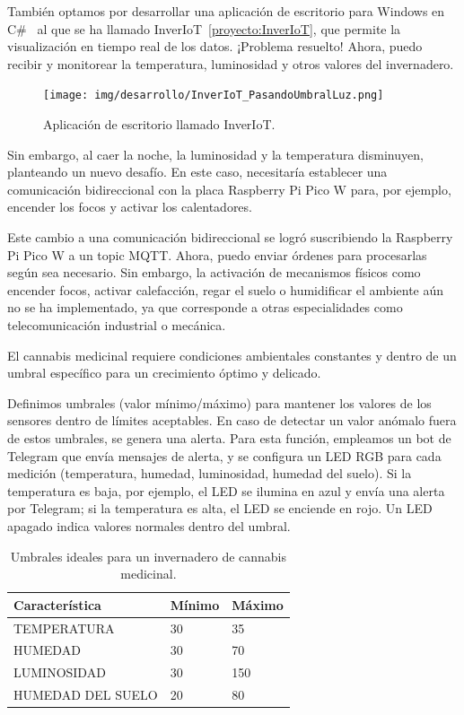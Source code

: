 También optamos por desarrollar una aplicación de escritorio para Windows en C\#~\cite{manual:CSharp} al que se ha llamado InverIoT~\ref{proyecto:InverIoT}, que permite la visualización en tiempo real de los datos. ¡Problema resuelto! Ahora, puedo recibir y monitorear la temperatura, luminosidad y otros valores del invernadero.

\begin{figure}[h]
	\centering
	\texttt{[image: img/desarrollo/InverIoT\_PasandoUmbralLuz.png]}
	\caption{Aplicación de escritorio llamado InverIoT.}
\end{figure}

Sin embargo, al caer la noche, la luminosidad y la temperatura disminuyen, planteando un nuevo desafío. En este caso, necesitaría establecer una comunicación bidireccional con la placa Raspberry Pi Pico W para, por ejemplo, encender los focos y activar los calentadores.

Este cambio a una comunicación bidireccional se logró suscribiendo la Raspberry Pi Pico W a un topic MQTT. Ahora, puedo enviar órdenes para procesarlas según sea necesario. Sin embargo, la activación de mecanismos físicos como encender focos, activar calefacción, regar el suelo o humidificar el ambiente aún no se ha implementado, ya que corresponde a otras especialidades como telecomunicación industrial o mecánica.

El cannabis medicinal requiere condiciones ambientales constantes y dentro de un umbral específico para un crecimiento óptimo y delicado.

Definimos umbrales (valor mínimo/máximo) para mantener los valores de los sensores dentro de límites aceptables. En caso de detectar un valor anómalo fuera de estos umbrales, se genera una alerta. Para esta función, empleamos un bot de Telegram que envía mensajes de alerta, y se configura un LED RGB para cada medición (temperatura, humedad, luminosidad, humedad del suelo). Si la temperatura es baja, por ejemplo, el LED se ilumina en azul y envía una alerta por Telegram; si la temperatura es alta, el LED se enciende en rojo. Un LED apagado indica valores normales dentro del umbral.

\begin{table}[htbp]
\begin{center}
\caption{Umbrales ideales para un invernadero de cannabis medicinal.}
\begin{tabular}{|l|l|l|}
\hline
\rowcolor[HTML]{C0C0C0} 
\textbf{Característica} & \textbf{Mínimo} & \textbf{Máximo} \\ \hline
TEMPERATURA & 30 & 35\\ \hline
HUMEDAD & 30 & 70\\ \hline
LUMINOSIDAD & 30 & 150\\ \hline
HUMEDAD DEL SUELO & 20 & 80\\ \hline
\end{tabular}
\end{center}
\end{table}

